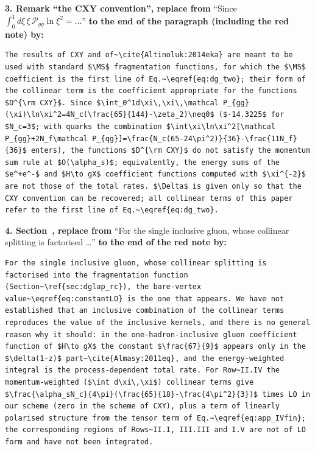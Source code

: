 \noindent\textbf{3. Remark ``the CXY convention'', replace from} ``Since $\int_0^1d\xi\,\xi\,\mathcal P_{gg}\ln\xi^2=\dots$'' \textbf{to the end of the paragraph (including the red note) by:}
\begin{lstlisting}
The results of CXY and of~\cite{Altinoluk:2014eka} are meant to be used with standard $\MS$ fragmentation functions, for which the $\MS$ coefficient is the first line of Eq.~\eqref{eq:dg_two}; their form of the collinear term is the coefficient appropriate for the functions $D^{\rm CXY}$. Since $\int_0^1d\xi\,\xi\,\mathcal P_{gg}(\xi)\ln\xi^2=4N_c(\frac{65}{144}-\zeta_2)\neq0$ ($-14.3225$ for $N_c=3$; with quarks the combination $\int\xi\ln\xi^2[\mathcal P_{gg}+2N_f\mathcal P_{qg}]=\frac{N_c(65-24\pi^2)}{36}-\frac{11N_f}{36}$ enters), the functions $D^{\rm CXY}$ do not satisfy the momentum sum rule at $O(\alpha_s)$; equivalently, the energy sums of the $e^+e^-$ and $H\to gX$ coefficient functions computed with $\xi^{-2}$ are not those of the total rates. $\Delta$ is given only so that the CXY convention can be recovered; all collinear terms of this paper refer to the first line of Eq.~\eqref{eq:dg_two}.
\end{lstlisting}

\noindent\textbf{4. Section~, replace from} ``For the single inclusive gluon, whose collinear splitting is factorised \ldots'' \textbf{to the end of the red note by:}
\begin{lstlisting}
For the single inclusive gluon, whose collinear splitting is factorised into the fragmentation function (Section~\ref{sec:dglap_rc}), the bare-vertex value~\eqref{eq:constantLO} is the one that appears. We have not established that an inclusive combination of the collinear terms reproduces the value of the inclusive kernels, and there is no general reason why it should: in the one-hadron-inclusive gluon coefficient function of $H\to gX$ the constant $\frac{67}{9}$ appears only in the $\delta(1-z)$ part~\cite{Almasy:2011eq}, and the energy-weighted integral is the process-dependent total rate. For Row~II.IV the momentum-weighted ($\int d\xi\,\xi$) collinear terms give $\frac{\alpha_sN_c}{4\pi}(\frac{65}{18}-\frac{4\pi^2}{3})$ times LO in our scheme (zero in the scheme of CXY), plus a term of linearly polarised structure from the tensor term of Eq.~\eqref{eq:app_IVfin}; the corresponding regions of Rows~II.I, III.III and I.V are not of LO form and have not been integrated.
\end{lstlisting}

